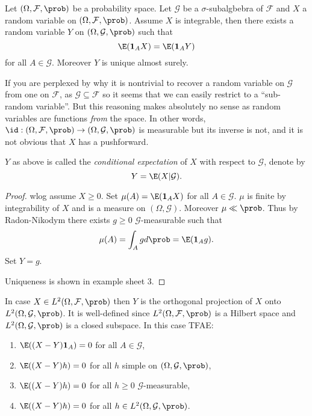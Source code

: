 \documentclass[a4paper]{article}
\renewcommand{\P}{\prob} %
\begin{document}
\begin{proposition}
  Let \((\Omega, \mathcal F, \P)\) be a probability space. Let \(\mathcal G\) be a \(\sigma\)-subalgbebra of \(\mathcal F\) and \(X\) a random variable on \((\Omega, \mathcal F, \P)\). Assume \(X\) is integrable, then there exists a random variable \(Y\) on \((\Omega, \mathcal G, \P)\) such that
  \[
    \E(\mathbf 1_A X) = \E(\mathbf 1_AY)
  \]
  for all \(A \in \mathcal G\). Moreover \(Y\) is unique almost surely.
\end{proposition}

If you are perplexed by why it is nontrivial to recover a random variable on \(\mathcal G\) from one on \(\mathcal F\), as \(\mathcal G \subseteq \mathcal F\) so it seems that we can easily restrict to a ``sub-random variable''. But this reasoning makes absolutely no sense as random variables are functions \emph{from} the space. In other words, \(\id: (\Omega, \mathcal F, \P) \to (\Omega, \mathcal G, \P)\) is measurable but its inverse is not, and it is not obvious that \(X\) has a pushforward.

\begin{definition}
  \(Y\) as above is called the \emph{conditional expectation} of \(X\) with respect to \(\mathcal G\), denote by
  \[
    Y = \E(X | \mathcal G).
  \]
\end{definition}

\begin{proof}
  wlog assume \(X \geq 0\). Set \(\mu(A) = \E(\mathbf 1_A X)\) for all \(A \in \mathcal G\). \(\mu\) is finite by integrability of \(X\) and is a measure on \((\Omega, \mathcal G)\). Moreover \(\mu \ll \P\). Thus by Radon-Nikodym there exists \(g \geq 0\) \(\mathcal G\)-measurable such that
  \[
    \mu(A) = \int_A g d\P = \E(\mathbf 1_A g).
  \]
  Set \(Y = g\).

  Uniqueness is shown in example sheet 3.
\end{proof}

\begin{remark}
  In case \(X \in L^2(\Omega, \mathcal F, \P)\) then \(Y\) is the orthogonal projection of \(X\) onto \(L^2(\Omega, \mathcal G, \P)\). It is well-defined since \(L^2(\Omega, \mathcal F, \P)\) is a Hilbert space and \(L^2(\Omega, \mathcal G, \P)\) is a closed subspace. In this case TFAE:
  \begin{enumerate}
  \item \(\E((X - Y) \mathbf 1_A) = 0\) for all \(A \in \mathcal G\),
  \item \(\E((X - Y) h) = 0\) for all \(h\) simple on \((\Omega, \mathcal G, \P)\),
  \item \(\E((X - Y) h) = 0\) for all \(h \geq 0\) \(\mathcal G\)-measurable,
  \item \(\E((X - Y) h) = 0\) for all \(h \in L^2(\Omega, \mathcal G, \P)\).
  \end{enumerate}
\end{remark}
\end{document}
